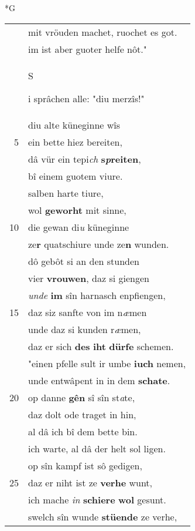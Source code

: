 \documentclass[8pt,a4paper,notitlepage]{article}
\begin{document}
\begin{table}[ht]
\begin{minipage}[t]{0.5\linewidth}
\small
\begin{center}*G
\end{center}
\begin{tabular}{rl}
 & mit vröuden machet, ruochet es got.\\ 
 & im ist aber guoter helfe nôt."\\ 
 & \begin{large}S\end{large}i sprâchen alle: "diu merzîs!"\\ 
 & diu alte küneginne wîs\\ 
5 & ein bette hiez bereiten,\\ 
 & dâ vür ein tepi\textit{ch} \textbf{s\textit{p}reiten},\\ 
 & bî einem guotem viure.\\ 
 & salben harte tiure,\\ 
 & wol \textbf{geworht} mit sinne,\\ 
10 & die gewan di\textit{u} küneginne\\ 
 & ze\textbf{r} quatschiure unde ze\textbf{n} wunden.\\ 
 & dô gebôt si an den stunden\\ 
 & vier \textbf{vrouwen}, daz si giengen\\ 
 & \textit{unde} \textbf{im} sîn harnasch enpfiengen,\\ 
15 & daz siz sanfte von im n\textit{æ}men\\ 
 & unde daz si kunden r\textit{æ}men,\\ 
 & daz er sich \textbf{des} \textbf{iht} \textbf{dürfe} schemen.\\ 
 & "einen pfelle sult ir umbe \textbf{iuch} nemen,\\ 
 & unde entwâpent in in dem \textbf{schate}.\\ 
20 & op danne \textbf{gên} sî sîn st\textit{a}te,\\ 
 & daz dolt ode traget in hin,\\ 
 & al dâ ich bî dem bette bin.\\ 
 & ich warte, al dâ der helt sol ligen.\\ 
 & op sîn kampf ist sô gedigen,\\ 
25 & daz er niht ist ze \textbf{verhe} wunt,\\ 
 & ich mache \textit{in} \textbf{schiere} \textbf{wol} gesunt.\\ 
 & swelch sîn wunde \textbf{stüende} ze verhe,\\ 

\end{tabular}
\end{minipage}
\end{table}
\end{document}
